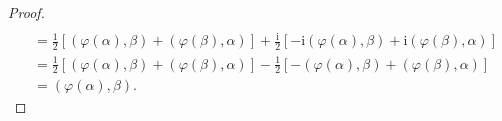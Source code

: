 \documentclass[../../main.tex]{subfiles}%
\begin{document}
\begin{proof}
\begin{align*}
\\
&=\frac{1}{2}\left[ \left( \varphi \left( \alpha \right) ,\beta \right) +\left( \varphi \left( \beta \right) ,\alpha \right) \right] +\frac{\mathrm{i}}{2}\left[ -\mathrm{i}\left( \varphi \left( \alpha \right) ,\beta \right) +\mathrm{i}\left( \varphi \left( \beta \right) ,\alpha \right) \right] 
\\
&=\frac{1}{2}\left[ \left( \varphi \left( \alpha \right) ,\beta \right) +\left( \varphi \left( \beta \right) ,\alpha \right) \right] -\frac{1}{2}\left[ -\left( \varphi \left( \alpha \right) ,\beta \right) +\left( \varphi \left( \beta \right) ,\alpha \right) \right] 
\\
&=\left( \varphi \left( \alpha \right) ,\beta \right) .
\end{align*}

\end{proof}
\end{document}
